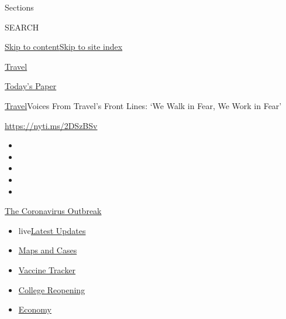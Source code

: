Sections

SEARCH

\protect\hyperlink{site-content}{Skip to
content}\protect\hyperlink{site-index}{Skip to site index}

\href{https://www.nytimes.com/section/travel}{Travel}

\href{https://myaccount.nytimes.com/auth/login?response_type=cookie\&client_id=vi}{}

\href{https://www.nytimes.com/section/todayspaper}{Today's Paper}

\href{/section/travel}{Travel}\textbar{}Voices From Travel's Front
Lines: `We Walk in Fear, We Work in Fear'

\url{https://nyti.ms/2DSzBSv}

\begin{itemize}
\item
\item
\item
\item
\item
\end{itemize}

\href{https://www.nytimes.com/news-event/coronavirus?action=click\&pgtype=Article\&state=default\&region=TOP_BANNER\&context=storylines_menu}{The
Coronavirus Outbreak}

\begin{itemize}
\tightlist
\item
  live\href{https://www.nytimes.com/2020/08/04/world/coronavirus-cases.html?action=click\&pgtype=Article\&state=default\&region=TOP_BANNER\&context=storylines_menu}{Latest
  Updates}
\item
  \href{https://www.nytimes.com/interactive/2020/us/coronavirus-us-cases.html?action=click\&pgtype=Article\&state=default\&region=TOP_BANNER\&context=storylines_menu}{Maps
  and Cases}
\item
  \href{https://www.nytimes.com/interactive/2020/science/coronavirus-vaccine-tracker.html?action=click\&pgtype=Article\&state=default\&region=TOP_BANNER\&context=storylines_menu}{Vaccine
  Tracker}
\item
  \href{https://www.nytimes.com/2020/08/02/us/covid-college-reopening.html?action=click\&pgtype=Article\&state=default\&region=TOP_BANNER\&context=storylines_menu}{College
  Reopening}
\item
  \href{https://www.nytimes.com/live/2020/08/04/business/stock-market-today-coronavirus?action=click\&pgtype=Article\&state=default\&region=TOP_BANNER\&context=storylines_menu}{Economy}
\end{itemize}

